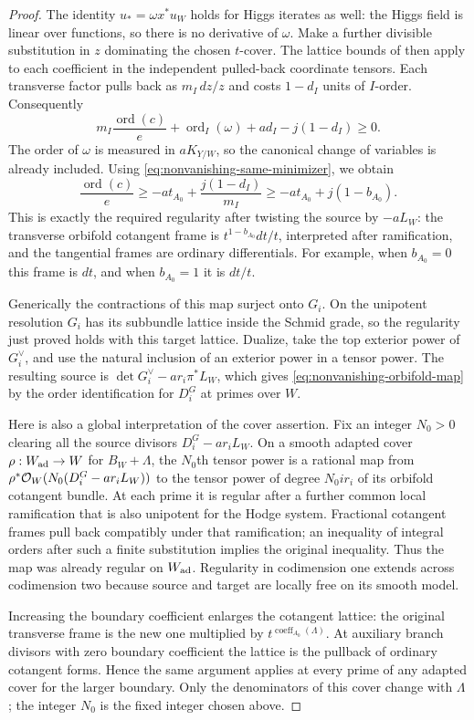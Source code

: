 \begin{proof}
The identity $u_*=\omega x^*u_W$ holds for Higgs iterates as well:
the Higgs field is linear over functions, so there is no derivative of
$\omega$.  Make a further divisible substitution in $z$ dominating
the chosen $t$-cover.  The lattice bounds of
 then apply to each
coefficient in the independent pulled-back coordinate tensors.
Each transverse factor pulls back as $m_I\,dz/z$ and costs
$1-d_I$ units of $I$-order.  Consequently
\[
 m_I\frac{\operatorname{ord}(c)}{e}
       +\operatorname{ord}_I(\omega)+ad_I-j(1-d_I)\ge0.
\]
The order of $\omega$ is measured in $aK_{Y/W}$, so the canonical
change of variables is already included.  Using
\eqref{eq:nonvanishing-same-minimizer}, we obtain
\begin{equation}\label{eq:nonvanishing-orbifold-order}
 \frac{\operatorname{ord}(c)}e
       \ge-at_{A_0}+\frac{j(1-d_I)}{m_I}
       \ge-at_{A_0}+j(1-b_{A_0}).
\end{equation}
This is exactly the required regularity after twisting the source by
$-aL_W$: the transverse orbifold cotangent frame is
$t^{1-b_{A_0}}dt/t$, interpreted after ramification, and the tangential
frames are ordinary differentials.  For example, when $b_{A_0}=0$
this frame is $dt$, and when $b_{A_0}=1$ it is $dt/t$.

Generically the contractions of this map surject onto $G_i$.  On the
unipotent resolution $G_i$ has its subbundle lattice inside the Schmid
grade, so the regularity just proved holds with this target lattice.
Dualize, take the top exterior power of $G_i^\vee$, and use the natural
inclusion of an exterior power in a tensor power.  The resulting source
is $\det G_i^\vee-ar_i\pi^*L_W$, which gives
\eqref{eq:nonvanishing-orbifold-map} by the order identification for
$D_i^G$ at primes over $W$.

Here is also a global interpretation of the cover assertion.  Fix an
integer $N_0>0$ clearing all the source divisors
$D_i^G-ar_iL_W$.  On a smooth adapted cover $\rho:W_{\rm ad}\to W$
for $B_W+\Lambda$, the $N_0$th tensor power is a rational map from
$\rho^*\mathcal O_W(N_0(D_i^G-ar_iL_W))$ to the tensor power of degree
$N_0ir_i$ of its orbifold cotangent bundle.  At each prime it is regular
after a further common local ramification that is also unipotent for
the Hodge system.  Fractional cotangent frames pull back compatibly
under that ramification; an inequality of integral orders after such
a finite substitution implies the original inequality.  Thus the map
was already regular on $W_{\rm ad}$.  Regularity in codimension one
extends across codimension two because source and target are locally
free on its smooth model.

Increasing the boundary coefficient enlarges the cotangent lattice:
the original transverse frame is the new one multiplied by
$t^{\operatorname{coeff}_{A_0}(\Lambda)}$.  At auxiliary branch
divisors with zero boundary coefficient the lattice is the pullback
of ordinary cotangent forms.  Hence the same argument applies at every
prime of any adapted cover for the larger boundary.  Only the
denominators of this cover change with $\Lambda$; the integer $N_0$
is the fixed integer chosen above.
\end{proof}

